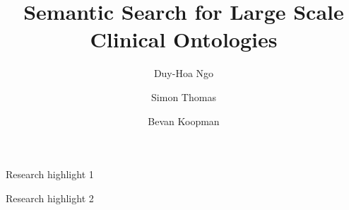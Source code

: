 \documentclass[preprint,12pt]{elsarticle}
\begin{document}
\begin{frontmatter}



\title{Semantic Search for Large Scale Clinical Ontologies}


\author{Duy-Hoa Ngo}
\author{Simon Thomas}
\author{Bevan Koopman}



\begin{abstract}

\end{abstract}

\begin{graphicalabstract}
\end{graphicalabstract}

\begin{highlights}
\item Research highlight 1
\item Research highlight 2
\end{highlights}

\begin{keyword}



\end{keyword}

\end{frontmatter}
\end{document}
